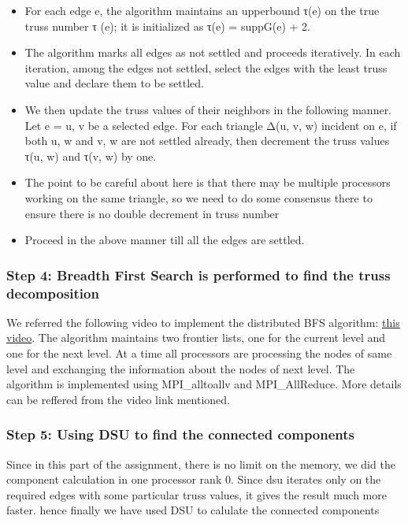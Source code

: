 \documentclass{article}
\begin{document}
\begin{itemize}
    \item For each edge e, the algorithm maintains an upperbound τ(e) on the true truss number τ (e); it is initialized as τ(e) = suppG(e) + 2.
    \item The algorithm marks all edges as not settled and proceeds iteratively. In each iteration, among the edges not settled, select the edges with the least truss value and declare them to be settled.
    \item We then update the truss values of their neighbors in the following manner. Let e = u, v be a selected edge. For each triangle Δ(u, v, w) incident on e, if both u, w and v, w are not settled already, then decrement the truss values τ(u, w) and τ(v, w) by one.
    \item The point to be careful about here is that there may be multiple processors working on the same triangle, so we need to do some consensus there to ensure there is no double decrement in truss number
    \item Proceed in the above manner till all the edges are settled.

\end{itemize}


\subsubsection{Step 4: Breadth First Search is performed to find the truss decomposition}
We referred the following video to implement the distributed BFS algorithm: \href{https://www.youtube.com/watch?v=wpWvCabHqQU}{this video}. The algorithm maintains two frontier lists, one for the current level and one for the next level. At a time all processors are processing the nodes of same level and exchanging the information about the nodes of next level. The algorithm is implemented using MPI\_alltoallv and MPI\_AllReduce. More details can be reffered from the video link mentioned.

\subsubsection{Step 5: Using DSU to find the connected components}
Since in this part of the assignment, there is no limit on the memory, we did the component calculation in one processor rank 0. Since dsu iterates only on the required edges with some particular truss values, it gives the result much more faster. hence finally we have used DSU to calulate the connected components
\end{document}
